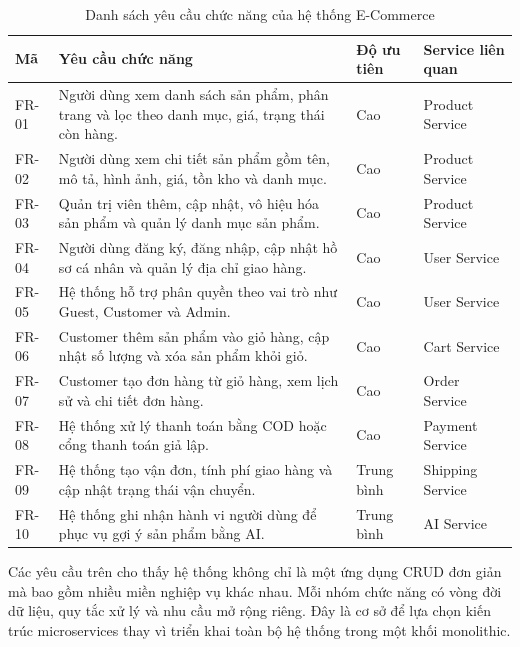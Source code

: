 \documentclass[../main.tex]{subfiles}
\begin{document}
\begin{table}[H]
    \centering
    \caption{Danh sách yêu cầu chức năng của hệ thống E-Commerce}
    \label{tab:chapter2-functional-requirements}
    \begin{tabular}{|p{}|p{}|p{}|p{}|}
        \hline
        \rowcolor{primary!35}
        \textbf{Mã} & \textbf{Yêu cầu chức năng} & \textbf{Độ ưu tiên} & \textbf{Service liên quan} \\
        \hline
        FR-01 & Người dùng xem danh sách sản phẩm, phân trang và lọc theo danh mục, giá, trạng thái còn hàng. & Cao & Product Service \\
        \hline
        FR-02 & Người dùng xem chi tiết sản phẩm gồm tên, mô tả, hình ảnh, giá, tồn kho và danh mục. & Cao & Product Service \\
        \hline
        FR-03 & Quản trị viên thêm, cập nhật, vô hiệu hóa sản phẩm và quản lý danh mục sản phẩm. & Cao & Product Service \\
        \hline
        FR-04 & Người dùng đăng ký, đăng nhập, cập nhật hồ sơ cá nhân và quản lý địa chỉ giao hàng. & Cao & User Service \\
        \hline
        FR-05 & Hệ thống hỗ trợ phân quyền theo vai trò như Guest, Customer và Admin. & Cao & User Service \\
        \hline
        FR-06 & Customer thêm sản phẩm vào giỏ hàng, cập nhật số lượng và xóa sản phẩm khỏi giỏ. & Cao & Cart Service \\
        \hline
        FR-07 & Customer tạo đơn hàng từ giỏ hàng, xem lịch sử và chi tiết đơn hàng. & Cao & Order Service \\
        \hline
        FR-08 & Hệ thống xử lý thanh toán bằng COD hoặc cổng thanh toán giả lập. & Cao & Payment Service \\
        \hline
        FR-09 & Hệ thống tạo vận đơn, tính phí giao hàng và cập nhật trạng thái vận chuyển. & Trung bình & Shipping Service \\
        \hline
        FR-10 & Hệ thống ghi nhận hành vi người dùng để phục vụ gợi ý sản phẩm bằng AI. & Trung bình & AI Service \\
        \hline
    \end{tabular}
\end{table}

Các yêu cầu trên cho thấy hệ thống không chỉ là một ứng dụng CRUD đơn giản mà bao gồm nhiều miền nghiệp vụ khác nhau. Mỗi nhóm chức năng có vòng đời dữ liệu, quy tắc xử lý và nhu cầu mở rộng riêng. Đây là cơ sở để lựa chọn kiến trúc microservices thay vì triển khai toàn bộ hệ thống trong một khối monolithic.
\end{document}
